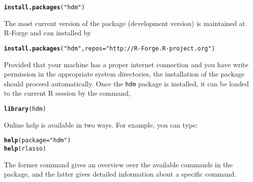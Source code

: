 \documentclass{amsart}\usepackage[]{graphicx}\usepackage[]{color}
\makeatletter
\newcommand{\hlstr}[1]{\textcolor[rgb]{0.192,0.494,0.8}{#1}}%
\newcommand{\hlstd}[1]{\textcolor[rgb]{0.345,0.345,0.345}{#1}}%
\newcommand{\hlkwc}[1]{\textcolor[rgb]{0.333,0.667,0.333}{#1}}%
\newcommand{\hlkwd}[1]{\textcolor[rgb]{0.737,0.353,0.396}{\textbf{#1}}}%
\newenvironment{kframe}{%
 \def\at@end@of@kframe{}%
 \ifinner\ifhmode%
  \def\at@end@of@kframe{\end{minipage}}%
  \begin{minipage}{\columnwidth}%
 \fi\fi%
 \def\FrameCommand##1{\hskip\@totalleftmargin \hskip-\fboxsep
 \colorbox{shadecolor}{##1}\hskip-\fboxsep
     \hskip-\linewidth \hskip-\@totalleftmargin \hskip\columnwidth}%
 \MakeFramed {\advance\hsize-\width
   \@totalleftmargin\z@ \linewidth\hsize
   \@setminipage}}%
 {\par\unskip\endMakeFramed%
 \at@end@of@kframe}
\newenvironment{knitrout}{}{} %
\newcommand{\R}{{\normalfont\textsf{R }}{}}
\makeatother
\begin{document}
\begin{knitrout}
\color{fgcolor}\begin{kframe}
\begin{alltt}
\hlkwd{install.packages}\hlstd{(}\hlstr{"hdm"}\hlstd{)}
\end{alltt}
\end{kframe}
\end{knitrout}

\noindent
The most current version of the package (development version) is maintained at R-Forge and can installed by

\begin{knitrout}
\color{fgcolor}\begin{kframe}
\begin{alltt}
\hlkwd{install.packages}\hlstd{(}\hlstr{"hdm"}\hlstd{,} \hlkwc{repos} \hlstd{=} \hlstr{"http://R-Forge.R-project.org"}\hlstd{)}
\end{alltt}
\end{kframe}
\end{knitrout}


\noindent
Provided that your machine has a proper internet connection and you
have write permission in the appropriate system directories,
the installation of the package should proceed automatically.
Once the \texttt{hdm} package is installed, it can be loaded to the current \R session by the command,
\begin{knitrout}
\color{fgcolor}\begin{kframe}
\begin{alltt}
\hlkwd{library}\hlstd{(hdm)}
\end{alltt}
\end{kframe}
\end{knitrout}


Online help is available in two ways.  For example, 
you  can type:
\begin{knitrout}
\color{fgcolor}\begin{kframe}
\begin{alltt}
\hlkwd{help}\hlstd{(}\hlkwc{package} \hlstd{=} \hlstr{"hdm"}\hlstd{)}
\hlkwd{help}\hlstd{(rlasso)}
\end{alltt}
\end{kframe}
\end{knitrout}
The former command gives an overview over the available commands in the package, and
the latter gives detailed information about a specific command.
\end{document}
